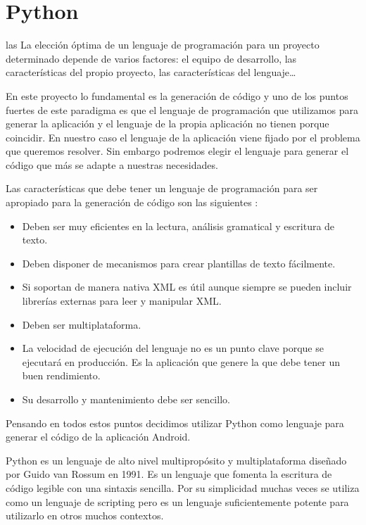 \section{Python}las\label{sec:tecnologias:python}
La elección óptima de un lenguaje de programación para un proyecto determinado depende de varios factores: el equipo de desarrollo, las características del propio proyecto, las características del lenguaje\ldots\par
En este proyecto lo fundamental es la generación de código y uno de los puntos fuertes de este paradigma es que el lenguaje de programación que utilizamos para generar la aplicación y el lenguaje de la propia aplicación no tienen porque coincidir. En nuestro caso el lenguaje de la aplicación viene fijado por el problema que queremos resolver. Sin embargo podremos elegir el lenguaje para generar el código que más se adapte a nuestras necesidades.\par
Las características que debe tener un lenguaje de programación para ser apropiado para la generación de código son las siguientes \cite{herrington2003code}:
\begin{itemize}
\item Deben ser muy eficientes en la lectura, análisis gramatical y escritura de texto.
\item Deben disponer de mecanismos para crear plantillas de texto fácilmente.
\item Si soportan de manera nativa XML es útil aunque siempre se pueden incluir librerías externas para leer y manipular XML.
\item Deben ser multiplataforma.
\item La velocidad de ejecución del lenguaje no es un punto clave porque se ejecutará en producción. Es la aplicación que genere la que debe tener un buen rendimiento.
\item Su desarrollo y mantenimiento debe ser sencillo. 
\end{itemize}
\medskip\par
Pensando en todos estos puntos decidimos utilizar Python como lenguaje para generar el código de la aplicación Android.\par
Python es un lenguaje de alto nivel multipropósito y multiplataforma diseñado por Guido van Rossum en 1991. Es un lenguaje que fomenta la escritura de código legible con una sintaxis sencilla. Por su simplicidad muchas veces se utiliza como un lenguaje de scripting pero es un lenguaje suficientemente potente para utilizarlo en otros muchos contextos.\par
